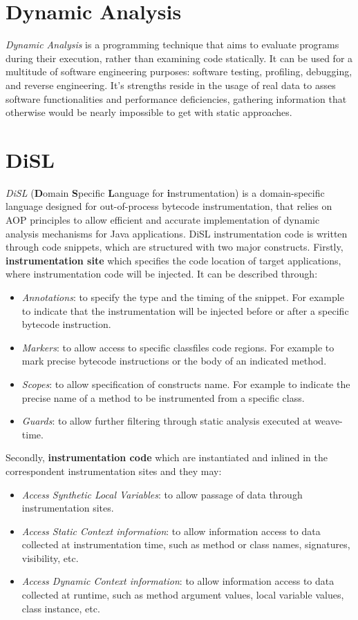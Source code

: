 \documentclass[]{usiinfthesis}
\begin{document}
\section{Dynamic Analysis}\label{sec:2.3}
\textit{Dynamic Analysis} is a programming technique that aims to evaluate programs during their execution, rather than examining code statically. It can be used for a multitude of software engineering purposes: software testing, profiling, debugging, and reverse engineering. It's strengths reside in the usage of real data to asses software functionalities and performance deficiencies, gathering information that otherwise would be nearly impossible to get with static approaches. 

\section{DiSL} \label{sec:2.4}

\textit{DiSL} \cite{DiSL} (\textbf{D}omain \textbf{S}pecific \textbf{L}anguage for \textbf{i}nstrumentation) is a domain-specific language designed for out-of-process bytecode instrumentation, that relies on AOP principles to allow efficient and accurate implementation of dynamic analysis mechanisms for Java applications. DiSL instrumentation code is written through code snippets, which are structured with two major constructs. Firstly, \textbf{instrumentation site} which specifies the code location of target applications, where instrumentation code will be injected. It can be described through:
\begin{itemize}
    \item \textit{Annotations}: to specify the type and the timing of the snippet. For example to indicate that the instrumentation will be injected before or after a specific bytecode instruction.
    \item \textit{Markers}: to allow access to specific classfiles code regions. For example to mark precise bytecode instructions or the body of an indicated method.
    \item \textit{Scopes}: to allow specification of constructs name. For example to indicate the precise name of a method to be instrumented from a specific class. 
    \item \textit{Guards}: to allow further filtering through static analysis executed at weave-time.
\end{itemize}
Secondly, \textbf{instrumentation code} which are instantiated and inlined in the correspondent instrumentation sites and they may:
\begin{itemize}
    \item \textit{Access Synthetic Local Variables}: to allow passage of data through instrumentation sites.
    \item \textit{Access Static Context information}: to allow information access to data collected at instrumentation time, such as method or class names, signatures, visibility, etc.
    \item \textit{Access Dynamic Context information}: to allow information access to data collected at runtime, such as method argument values, local variable values, class instance, etc.
\end{itemize}
\end{document}
